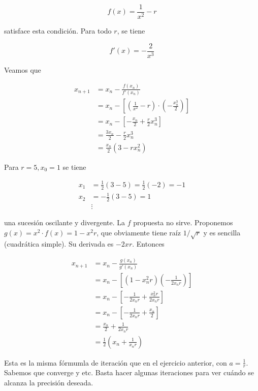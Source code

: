 \documentclass[12pt]{article}
\begin{document}
\begin{equation*}
    f(x) = \frac{1}{x^2} - r
\end{equation*}

satisface esta condición. Para todo $r$, se tiene 

\begin{equation*}
    f'(x) = -\frac{2}{x^3}
\end{equation*}

Veamos que 

\begin{align*}
    x_{n+1} 
    &= x_n - \frac{f(x_n)}{f'(x_n)} \\ 
    &= x_n - \left[ \left( \frac{1}{x^2} - r \right) \cdot \left( -\frac{x_n^3}{2}
    \right)   \right] \\ 
    &= x_n - \left[ -\frac{x_n}{2} + \frac{r}{2} x_n^3 \right]  \\ 
    &=\frac{3x_n}{2} -\frac{r}{2}x_n^3 \\ 
    &=\frac{x_n}{2}\left( 3 - rx_n^2 \right) 
\end{align*}

Para $r = 5, x_0 = 1$ se tiene 

\begin{align*}
    x_1 &= \frac{1}{2}\left( 3 - 5 \right) = \frac{1}{2}(-2) = -1 \\ 
    x_2&= -\frac{1}{2}\left( 3 - 5 \right) = 1 \\ 
       & \vdots
\end{align*}

una sucesión oscilante y divergente. La $f$ propuesta no sirve. Proponemos $g(x)
= x^2 \cdot f(x) = 1 - x^2 r$, que obviamente tiene raíz $1 / \sqrt{r}
$ y es sencilla (cuadrática simple). Su derivada es $-2xr$. Entonces

\begin{align*}
    x_{n+1} 
    &= x_n - \frac{g(x_n)}{g'(x_n)} \\ 
    &= x_n - \left[  \left( 1 - x_n^2 r \right) \left( -\frac{1}{2x_nr} \right)
    \right] \\ 
    &= x_n - \left[ -\frac{1}{2x_nr} + \frac{x_n^2 r}{2x_nr} \right]  \\ 
    &= x_n -\left[ -\frac{1}{2x_nr} + \frac{x_n}{2} \right]  \\ 
    &= \frac{x_n}{2} + \frac{1}{2x_n r} \\ 
    &= \frac{1}{2}\left( x_n + \frac{1}{x_nr} \right) 
\end{align*}

Esta es la misma fórmumla de iteración que en el ejercicio anterior, con $a =
\frac{1}{r}$. Sabemos que converge y etc. Basta hacer algunas iteraciones para
ver cuándo se alcanza la precisión deseada.
\end{document}
